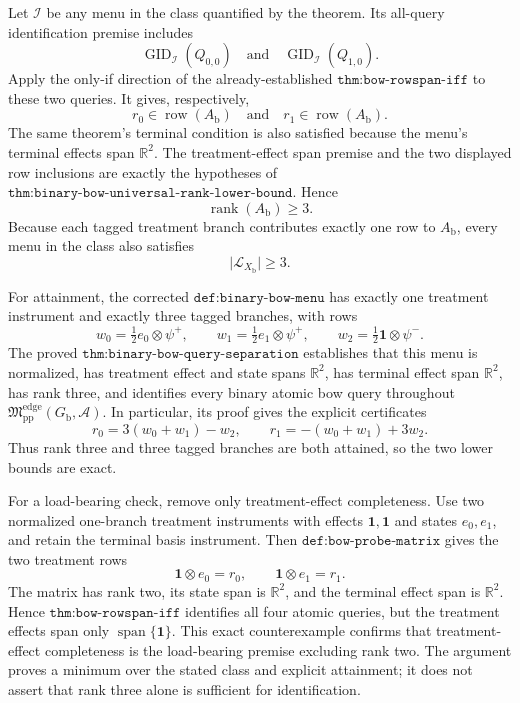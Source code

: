 Let \(\mathcal I\) be any menu in the class quantified by the theorem.  Its all-query identification premise includes
\[
 \operatorname{GID}_{\mathcal I}(Q_{0,0})
 \quad\text{and}\quad
 \operatorname{GID}_{\mathcal I}(Q_{1,0}).
\]
Apply the only-if direction of the already-established \(\texttt{thm:bow-rowspan-iff}\) to these two queries.  It gives, respectively,
\[
 r_0\in\operatorname{row}(A_{\mathrm b})
 \quad\text{and}\quad
 r_1\in\operatorname{row}(A_{\mathrm b}).
\]
The same theorem's terminal condition is also satisfied because the menu's terminal effects span \(\mathbb R^2\).  The treatment-effect span premise and the two displayed row inclusions are exactly the hypotheses of \(\texttt{thm:binary-bow-universal-rank-lower-bound}\).  Hence
\[
 \operatorname{rank}(A_{\mathrm b})\ge3.
\]
Because each tagged treatment branch contributes exactly one row to \(A_{\mathrm b}\), every menu in the class also satisfies
\[
 \lvert\mathcal L_{X_{\mathrm b}}\rvert\ge3.
\]

For attainment, the corrected \(\texttt{def:binary-bow-menu}\) has exactly one treatment instrument and exactly three tagged branches, with rows
\[
 w_0=\tfrac12e_0\otimes\psi^{+},\qquad
 w_1=\tfrac12e_1\otimes\psi^{+},\qquad
 w_2=\tfrac12\mathbf 1\otimes\psi^{-}.
\]
The proved \(\texttt{thm:binary-bow-query-separation}\) establishes that this menu is normalized, has treatment effect and state spans \(\mathbb R^2\), has terminal effect span \(\mathbb R^2\), has rank three, and identifies every binary atomic bow query throughout \(\mathfrak M_{\mathrm{pp}}^{\mathrm{edge}}(G_{\mathrm b},\mathcal A)\).  In particular, its proof gives the explicit certificates
\[
 r_0=3(w_0+w_1)-w_2,
 \qquad
 r_1=-(w_0+w_1)+3w_2.
\]
Thus rank three and three tagged branches are both attained, so the two lower bounds are exact.

For a load-bearing check, remove only treatment-effect completeness.  Use two normalized one-branch treatment instruments with effects \(\mathbf 1,\mathbf 1\) and states \(e_0,e_1\), and retain the terminal basis instrument.  Then \(\texttt{def:bow-probe-matrix}\) gives the two treatment rows
\[
 \mathbf 1\otimes e_0=r_0,
 \qquad
 \mathbf 1\otimes e_1=r_1.
\]
The matrix has rank two, its state span is \(\mathbb R^2\), and the terminal effect span is \(\mathbb R^2\).  Hence \(\texttt{thm:bow-rowspan-iff}\) identifies all four atomic queries, but the treatment effects span only \(\operatorname{span}\{\mathbf 1\}\).  This exact counterexample confirms that treatment-effect completeness is the load-bearing premise excluding rank two.  The argument proves a minimum over the stated class and explicit attainment; it does not assert that rank three alone is sufficient for identification.